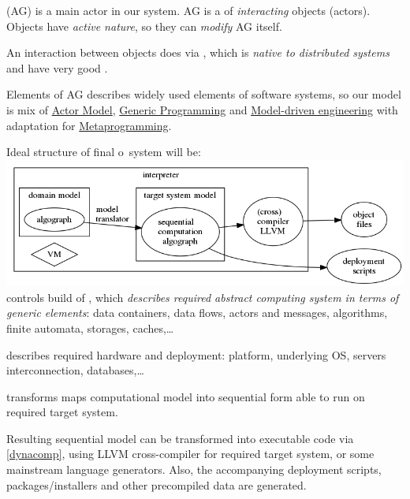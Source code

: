 \clearpage{}\secdown

\noindent {} (AG) is a main actor in our system. AG is a
 of \emph{interacting} objects (actors). Objects have
\emph{active nature}, so they can \emph{modify} AG itself.

\medskip\noindent
An interaction between objects does via , which is
\emph{native to distributed systems} and have very good .

\medskip\noindent
Elements of AG describes widely used elements of software systems, so our model
is mix of \href{http://en.wikipedia.org/wiki/Actor_model}{Actor Model},
\href{http://en.wikipedia.org/wiki/Generic_programming}{Generic Programming}
and \href{http://en.wikipedia.org/wiki/Model-driven_engineering}{Model-driven
engineering} with adaptation for
\href{http://en.wikipedia.org/wiki/Metaprogramming}{Metaprogramming}.

\clearpage\noindent
Ideal structure of final o\F\ system will be:\\
\includegraphics[width=\textwidth]{img/dynamodel.png}\\
 controls build of , which \emph{describes
required abstract computing system in terms of generic elements}: data
containers, data flows, actors and messages, algorithms, finite automata,
storages, caches,\ldots

 describes required hardware and deployment: platform,
underlying OS, servers interconnection, databases,\ldots

 transforms maps computational model into sequential form
able to run on required target system.

Resulting sequential model can be transformed into executable code via
 \ref{dynacomp}, using LLVM cross-compiler for
required target system, or some mainstream language generators. Also, the
accompanying deployment scripts, packages/installers and other precompiled data
are generated.




\secup
